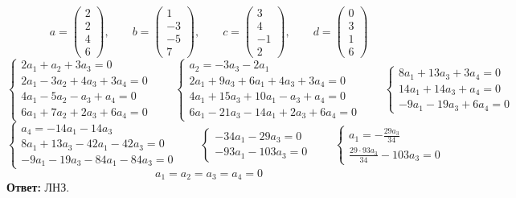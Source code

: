 $$ a =
\begin{pmatrix}
	2 \\
    2 \\
    4 \\
    6
\end{pmatrix}, \qquad b =
\begin{pmatrix}
	1 \\
    -3 \\
    -5 \\
    7
\end{pmatrix}, \qquad c =
\begin{pmatrix}
	3 \\
    4 \\
    -1 \\
    2
\end{pmatrix}, \qquad d =
\begin{pmatrix}
	0 \\
    3 \\
    1 \\
    6
\end{pmatrix} $$
$$
\begin{cases}
	2a_1 + a_2 + 3a_3 = 0 \\
    2a_1 - 3a_2 + 4a_3 + 3a_4 = 0 \\
    4a_1 - 5a_2 - a_3 + a_4 = 0 \\
    6a_1 + 7a_2 + 2a_3 + 6a_4 = 0
\end{cases} \qquad
\begin{cases}
	a_2 = -3a_3 - 2a_1 \\
    2a_1 + 9a_3 + 6a_1 + 4a_3 + 3a_4 = 0 \\
    4a_1 + 15a_3 + 10a_1 - a_3 + a_4 = 0 \\
    6a_1 - 21a_3 - 14a_1 + 2a_3 + 6a_4 = 0
\end{cases} \qquad
\begin{cases}
    8a_1 + 13a_3 + 3a_4 = 0 \\
    14a_1 + 14a_3 + a_4 = 0 \\
    -9a_1 - 19a_3 + 6a_4 = 0
\end{cases} $$
$$
\begin{cases}
    a_4 = -14a_1 - 14a_3 \\
    8a_1 + 13a_3 - 42a_1 - 42a_3 = 0 \\
    -9a_1 - 19a_3 - 84a_1 - 84a_3 = 0
\end{cases} \qquad
\begin{cases}
	-34a_1 - 29a_3 = 0 \\
    -93a_1 -103a_3 = 0
\end{cases} \qquad
\begin{cases}
    a_1 = -\frac{29a_3}{34} \\
    \frac{29 \cdot 93 a_3}{34} - 103a_3 = 0
\end{cases} $$
$$ a_1 = a_2 = a_3 = a_4 = 0 $$
\textbf{Ответ:} ЛНЗ.

